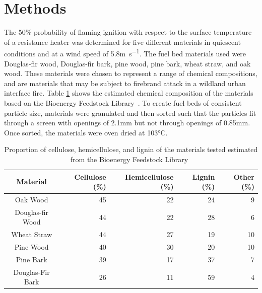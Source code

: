 \section{Methods}
\label{sec:methods3}
    The 50\% probability of flaming ignition with respect to the surface temperature of a resistance heater was determined for five different materials in quiescent conditions and at a wind speed of 5.8\si{\meter\per\second}. The fuel bed materials used were Douglas-fir wood, Douglas-fir bark, pine wood, pine bark, wheat straw, and oak wood. These materials were chosen to represent a range of chemical compositions, and are materials that may be subject to firebrand attack in a wildland urban interface fire. Table \ref{tab:composition} shows the estimated chemical composition of the materials based on the Bioenergy Feedstock Library~\cite{feedstock}. To create fuel beds of consistent particle size,  materials were granulated and then sorted such that the particles fit through a screen with openings of 2.1\si{\milli\meter} but not through openings of 0.85\si{\milli\meter}. Once sorted, the materials were oven dried at 103\si{\celsius}.
    \begin{table}[hpbt]
        \caption{Proportion of cellulose, hemicellulose, and lignin of the materials tested estimated from the Bioenergy Feedstock Library~\cite{feedstock}}
        \centering
        \begin{tabular}{crrrr}
            Material & Cellulose (\%) & Hemicellulose (\%) & Lignin (\%) & Other (\%) \\
            \hline
            Oak Wood         & 45 & 22 & 24 & 9\\
            Douglas-fir Wood & 44 & 22 & 28 & 6\\
            Wheat Straw      & 44 & 27 & 19 & 10\\
            Pine Wood        & 40 & 30 & 20 & 10\\
            Pine Bark        & 39 & 17 & 37 & 7\\
            Douglas-Fir Bark & 26 & 11 & 59 & 4 
        \end{tabular}
        \label{tab:composition}
    \end{table}

